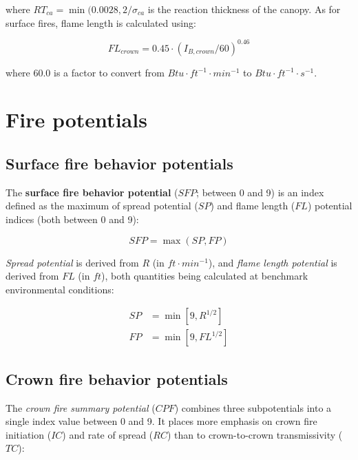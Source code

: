 \documentclass[]{book}
\begin{document}
where \(RT_{ca} = \min(0.0028, 2/\sigma_{ca}\) is the reaction thickness
of the canopy. As for surface fires, flame length is calculated using:

\begin{equation}
FL_{crown} = 0.45 \cdot (I_{B,crown}/60)^{0.46}
\end{equation}

where 60.0 is a factor to convert from
\(Btu\cdot ft^{-1} \cdot min^{-1}\) to
\(Btu\cdot ft^{-1} \cdot s^{-1}\).

\section{Fire potentials}\label{fire-potentials}

\subsection{Surface fire behavior
potentials}\label{surface-fire-behavior-potentials}

The \textbf{surface fire behavior potential} (\(SFP\); between 0 and 9)
is an index defined as the maximum of spread potential (\(SP\)) and
flame length (\(FL\)) potential indices (both between 0 and 9):

\begin{equation}
SFP = \max(SP, FP)
\end{equation}

\emph{Spread potential} is derived from \(R\) (in \(ft\cdot min^{-1}\)),
and \emph{flame length potential} is derived from \(FL\) (in \(ft\)),
both quantities being calculated at benchmark environmental conditions:

\begin{eqnarray}
SP &= \min \left[ 9, R^{1/2}\right] \\
FP &= \min \left[ 9, FL^{1/2}\right] 
\end{eqnarray}

\subsection{Crown fire behavior
potentials}\label{crown-fire-behavior-potentials}

The \emph{crown fire summary potential} (\(CPF\)) combines three
subpotentials into a single index value between 0 and 9. It places more
emphasis on crown fire initiation (\(IC\)) and rate of spread (\(RC\))
than to crown-to-crown transmissivity (\(TC\)):
\end{document}
